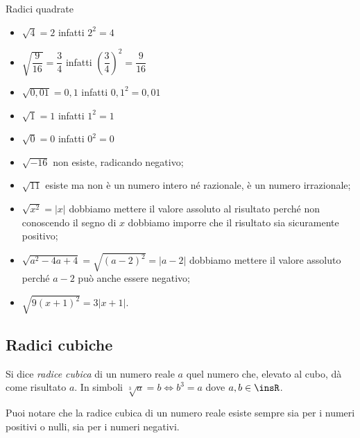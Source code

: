 \begin{exrig}
\begin{esempio}
Radici quadrate
 \begin{multicols}{2}
\begin{itemize}
\item $\sqrt 4=2$ infatti $2^2=4$
\item $\sqrt{\dfrac 9{16}}=\dfrac 3 4$ infatti $\left(\dfrac 3 4\right)^2=
  \dfrac 9{16}$
\item $\sqrt{0,01}=0,1$ infatti $0,1^2=0,01$
\item $\sqrt 1=1$ infatti $1^2=1$
\item $\sqrt 0=0$ infatti $0^2=0$
\item $\sqrt{-16}$ non esiste, radicando negativo;
\item $\sqrt{11}$ esiste ma non è un numero intero né razionale, 
  è un numero irrazionale;
\item $\sqrt{x^2}=\left|x\right|$ dobbiamo mettere il valore assoluto 
  al risultato perché non conoscendo il segno di $x$ dobbiamo imporre che 
  il risultato sia sicuramente positivo;
\item $\sqrt{a^2-4a+4}=\sqrt{(a-2)^2}=\left|a-2\right|$ dobbiamo mettere 
  il valore assoluto perché $a-2$ può anche essere negativo;
\item $\sqrt{9(x+1)^2}=3\left|x+1\right|$.
\end{itemize}
\end{multicols}
\end{esempio}
\end{exrig}

\subsection{Radici cubiche}

\begin{definizione}
 Si dice \emph{radice cubica} di un numero reale $a$ quel numero che, 
 elevato al cubo, dà come risultato $a$. 
 In simboli $\sqrt[3]a=b \Leftrightarrow b^3=a$ dove $a,b\in \insR$.
\end{definizione}

Puoi notare che la radice cubica di un numero reale esiste sempre sia per 
i numeri positivi o nulli, sia per i numeri negativi.


